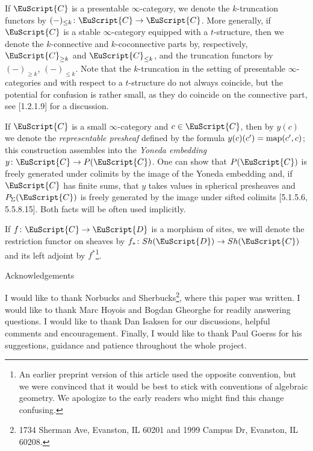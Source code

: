 \documentclass[oneside,a4paper]{amsart}
\makeatletter
\newcommand{\euscr}[1]{\EuScript{#1}} %
\newcommand{\ccat}{\euscr{C}} %
\newcommand{\dcat}{\euscr{D}} %
\newcommand{\map}{\textnormal{map}} %
\theoremstyle{plain}
\theoremstyle{definition}
\theoremstyle{remark}
\def\subsection{\@startsection{subsection}{1}%
  \z@{.7\linespacing\@plus\linespacing}{.5\linespacing}%
  {\normalfont\bfseries\centering}}%
\makeatother
\begin{document}
If $\ccat$ is a presentable $\infty$-category, we denote the $k$-truncation functors by $(-)_{\leq k}\colon \ccat \rightarrow \ccat$. More generally, if $\ccat$ is a stable $\infty$-category equipped with a $t$-structure, then we denote the $k$-connective and $k$-coconnective parts by, respectively, $\ccat_{\geq k}$ and $\ccat_{\leq k}$, and the truncation functors by $(-)_{\geq k}$, $(-)_{\leq k}$. Note that the $k$-truncation in the setting of presentable $\infty$-categories and with respect to a $t$-structure do not always coincide, but the potential for confusion is rather small, as they do coincide on the connective part, see \cite{higher_algebra}[1.2.1.9] for a discussion.

If $\ccat$ is a small $\infty$-category and $c \in \ccat$, then by $y(c)$ we denote the \emph{representable presheaf} defined by the formula $y(c)(c^\prime) = \map(c^\prime, c)$; this construction assembles into the \emph{Yoneda embedding} $y\colon \ccat \rightarrow P(\ccat)$. One can show that $P(\ccat)$ is freely generated under colimits by the image of the Yoneda embedding and, if $\ccat$ has finite sums, that $y$ takes values in spherical presheaves and $P_{\Sigma}(\ccat)$ is freely generated by the image under sifted colimits \cite{lurie_higher_topos_theory}[5.1.5.6, 5.5.8.15]. Both facts will be often used implicitly. 

If $f\colon \ccat \rightarrow \dcat$ is a morphism of sites, we will denote the restriction functor on sheaves by $f_{*}\colon Sh(\dcat) \rightarrow Sh(\ccat)$ and its left adjoint by $f^{*}$\footnote{An earlier preprint version of this article used the opposite convention, but we were convinced that it would be best to stick with conventions of algebraic geometry. We apologize to the early readers who might find this change confusing.}.

\subsection{Acknowledgements}

I would like to thank Norbucks and Sherbucks\footnote{1734 Sherman Ave, Evanston, IL 60201 and 1999 Campus Dr, Evanston, IL 60208.}, where this paper was written. I would like to thank Marc Hoyois and Bogdan Gheorghe for readily answering questions. I would like to thank Dan Isaksen for our discussions, helpful comments and encouragement. Finally, I would like to thank Paul Goerss for his suggestions, guidance and patience throughout the whole project. 
\end{document}
